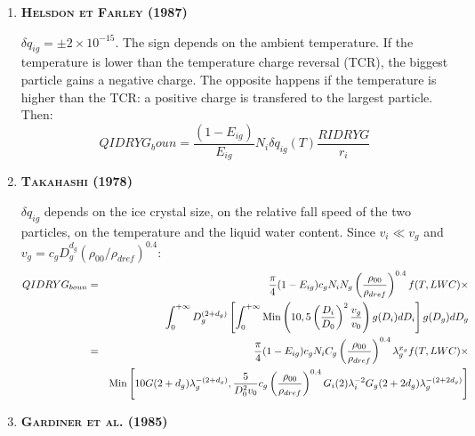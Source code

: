 \begin{enumerate}

  \item {\bf \textsc{Helsdon et Farley (1987)}}

$\delta q_{ig} = \pm 2 \times 10^{-15}$.
The sign depends on the ambient temperature.
If the temperature is lower than the temperature charge reversal (TCR), the biggest particle gains a negative charge.
The opposite happens if the temperature is higher than the TCR: a positive charge is transfered to the largest particle.
Then:
\begin{equation}
  QIDRYG_boun = \frac{(1 - E_{ig})}{E_{ig}} N_i \delta q_{ig}(T) \frac{RIDRYG}{r_i}
\end{equation}


  \item {\bf \textsc{Takahashi (1978)}}

$\delta q_{ig}$ depends on the ice crystal size, on the relative fall speed of the two particles, on the temperature and the liquid water content.
Since $v_i \ll v_g$ and $v_g = c_g D_g ^{d_g} (\rho_{00} / \rho_{dref})^{0.4}$:
\begin{eqnarray}
  QIDRYG_{boun} &=& \frac{\pi}{4} (1 - E_{ig}) c_g N_i N_g
                    \left( \frac{\rho _{00}}{\rho _{dref}} \right)^{0.4}
                    f(T, LWC) \times \nonumber \\  
                & & \int_0 ^{+ \infty} D_g ^{(2 + d_g)} \left[
                      \int_0 ^{+ \infty} {\rm Min} \left( 10, 
                        5 \left( \frac{D_i}{D_0} \right) ^2 \frac{v_g}{v_0}
                        \right)
                      g(D_i) dD_i \right] g(D_g) dD_g \nonumber \\
                &=& \frac{\pi}{4} (1 - E_{ig}) c_g N_i C_g
                    \left( \frac{\rho _{00}}{\rho _{dref}} \right)^{0.4}
                    \lambda _g ^{x_g} f(T, LWC) \times
                    \nonumber \\
                & & {\rm Min} \left[
                      10 G(2 + d_g) \lambda _g ^{-(2 + d_g)},
                        \frac{5}{D_0 ^2 v_0} c_g
                        \left( \frac{\rho _{00}}{\rho _{dref}} \right)^{0.4}
                        G_i(2) \lambda _i ^{-2}
                        G_g(2 + 2d_g) 
                        \lambda _g ^{-(2 + 2d_g)} \right] 
                      \nonumber \\
\end{eqnarray}

  \item {\bf \textsc{Gardiner et al. (1985)}}


\end{enumerate}
